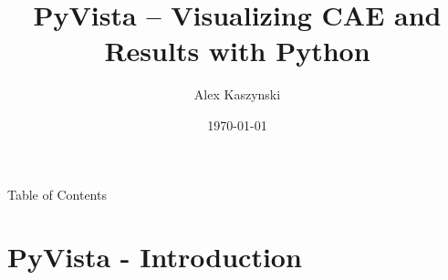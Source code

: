 \documentclass[t]{beamer}
\begin{document}

\title{PyVista – Visualizing CAE and Results with Python}
\author{Alex Kaszynski}
\date{\today}

\titleframe{}



\begin{frame}{Table of Contents}
  \tableofcontents
  \vspace{200pt}  %
\end{frame}

\section{PyVista - Introduction}
\end{document}
